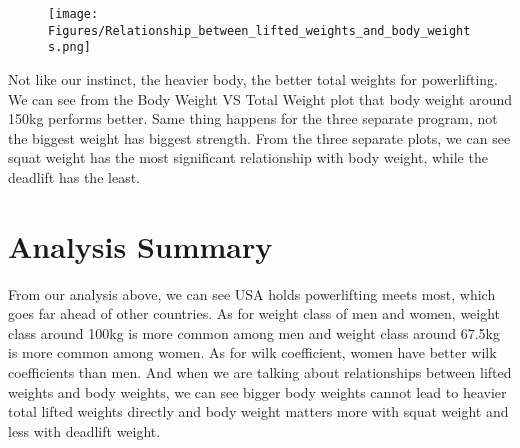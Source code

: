 \documentclass{article}
\begin{document}
	\begin{figure}[H]
	\centering
	\texttt{[image: Figures/Relationship\_between\_lifted\_weights\_and\_body\_weights.png]}
	\end{figure}

Not like our instinct, the heavier body, the better total weights for powerlifting. We can see from the Body Weight VS Total Weight plot that body weight around 150kg performs better. Same thing happens for the three separate program, not the biggest weight has biggest strength. From the three separate plots, we can see squat weight has the most significant relationship with body weight, while the deadlift has the least.



\section{Analysis Summary}

From our analysis above, we can see USA holds powerlifting meets most, which goes far ahead of other countries. As for weight class of men and women, weight class around 100kg is more common among men and weight class around 67.5kg is more common among women. As for wilk coefficient, women have better wilk coefficients than men. And when we are talking about relationships between lifted weights and body weights, we can see bigger body weights cannot lead to heavier total lifted weights directly and body weight matters more with squat weight and less with deadlift weight.
\end{document}
